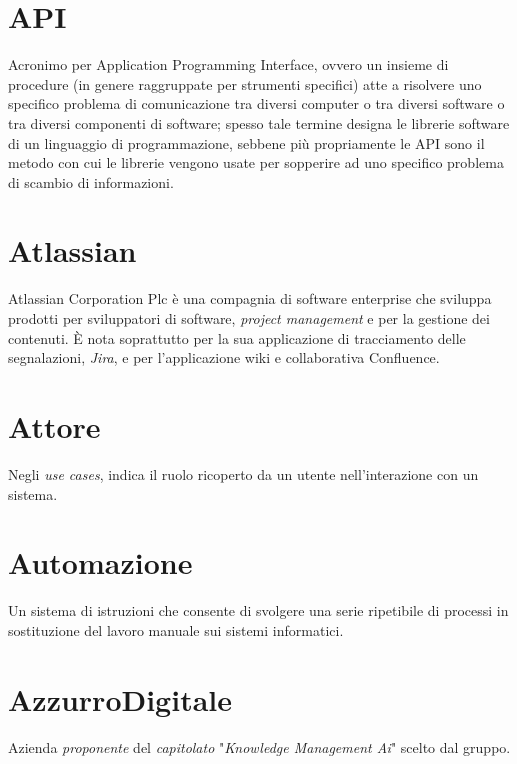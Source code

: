 \section{API}\label{sec:Application Programming Interface}
Acronimo per Application Programming Interface, ovvero un insieme di procedure (in genere raggruppate per strumenti specifici) atte a risolvere uno specifico problema di comunicazione tra diversi computer o tra diversi software o tra diversi componenti di software; spesso tale termine designa le librerie software di un linguaggio di programmazione, sebbene più propriamente le API sono il metodo con cui le librerie vengono usate per sopperire ad uno specifico problema di scambio di informazioni.

\section{Atlassian}
Atlassian Corporation Plc è una compagnia di software enterprise che sviluppa prodotti per sviluppatori di software, \emph{project management} e per la gestione dei contenuti. È nota soprattutto per la sua applicazione di tracciamento delle segnalazioni, \emph{Jira}, e per l'applicazione wiki e collaborativa Confluence.

\section{Attore}\label{sec:Attori}
Negli \emph{use cases}, indica il ruolo ricoperto da un utente nell'interazione con un sistema.

\section{Automazione}\label{sec:Automazioni}
Un sistema di istruzioni che consente di svolgere una serie ripetibile di processi in sostituzione del lavoro manuale sui sistemi informatici.

\section{AzzurroDigitale}
Azienda \emph{proponente} del \emph{capitolato} "\emph{Knowledge Management Ai}" scelto dal gruppo.
